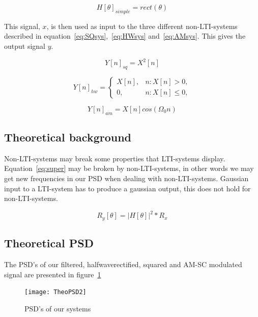 \documentclass[10pt]{article}
\begin{document}
\begin{equation}
  \label{eq:idealH2}
  H[\theta]_{simple} =rect(\theta)
\end{equation}

This signal, $x$, is then used as input to the three different non-LTI-systems
described in equation~\ref{eq:SQsys},~\ref{eq:HWsys} and~\ref{eq:AMsys}.
This gives the output signal $y$.

\begin{equation}
  \label{eq:SQsys}
  Y[n]_{sq} =X^2[n]
\end{equation}

\begin{equation}
  \label{eq:HWsys}
  Y[n]_{hw} =
\begin{cases}
   X[n],& n: X[n]>0,\\
    0,    & n: X[n] \leq 0,
\end{cases}
\end{equation}


\begin{equation}
  \label{eq:AMsys}
  Y[n]_{am} =X[n]cos(\Omega_{0}n)
\end{equation}

\subsection{Theoretical background}

Non-LTI-systems may break some properties that LTI-systems display.
Equation~\ref{eq:super} may be broken by non-LTI-systems, in other words we may
get new frequencies in our PSD when dealing with non-LTI-systems.
Gaussian input to a LTI-system has to produce a gaussian output, this does not
hold for non-LTI-systems.

\begin{equation}
  \label{eq:super}
  R_y[\theta] =|H[\theta]|^2*R_x
\end{equation}


\subsection{Theoretical PSD}
The PSD's of our filtered, halfwaverectified, squared and AM-SC modulated signal
are presented in figure~\ref{fig:theoPSD2}

\begin{figure}[!hp]

    \begin{center}
      \texttt{[image: TheoPSD2]}
    \caption{PSD's of our systems \label{fig:theoPSD2}}
    \end{center}

\end{figure}
\end{document}
